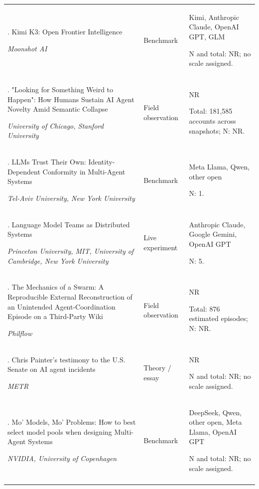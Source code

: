 \begin{longtable}{@{}>{\raggedright\arraybackslash}p{}>{\raggedright\arraybackslash}p{}>{\raggedright\arraybackslash}p{}@{}}
91. Kimi K3: Open Frontier Intelligence \citep{kimi-k3-swarm-bench}\par\emph{Moonshot AI} & Benchmark & Kimi, Anthropic Claude, OpenAI GPT, GLM\par N and total: NR; no scale assigned. \\ \addlinespace[2pt]
92. "Looking for Something Weird to Happen": How Humans Sustain AI Agent Novelty Amid Semantic Collapse \citep{lai-looking-for-something-weird}\par\emph{University of Chicago, Stanford University} & Field observation & NR\par Total: 181,585 accounts across snapshots; N: NR. \\ \addlinespace[2pt]
93. LLMs Trust Their Own: Identity-Dependent Conformity in Multi-Agent Systems \citep{llms-trust-their-own}\par\emph{Tel-Aviv University, New York University} & Benchmark & Meta Llama, Qwen, other open\par N: 1. \\ \addlinespace[2pt]
94. Language Model Teams as Distributed Systems \citep{lm-teams-distributed-systems}\par\emph{Princeton University, MIT, University of Cambridge, New York University} & Live experiment & Anthropic Claude, Google Gemini, OpenAI GPT\par N: 5. \\ \addlinespace[2pt]
95. The Mechanics of a Swarm: A Reproducible External Reconstruction of an Unintended Agent-Coordination Episode on a Third-Party Wiki \citep{lutje-mechanics-of-a-swarm}\par\emph{Philflow} & Field observation & NR\par Total: 876 estimated episodes; N: NR. \\ \addlinespace[2pt]
96. Chris Painter's testimony to the U.S. Senate on AI agent incidents \citep{metr-senate-testimony}\par\emph{METR} & Theory / essay & NR\par N and total: NR; no scale assigned. \\ \addlinespace[2pt]
97. Mo' Models, Mo' Problems: How to best select model pools when designing Multi-Agent Systems \citep{mo-models-mo-problems}\par\emph{NVIDIA, University of Copenhagen} & Benchmark & DeepSeek, Qwen, other open, Meta Llama, OpenAI GPT\par N and total: NR; no scale assigned. \\ \addlinespace[2pt]

\end{longtable}
